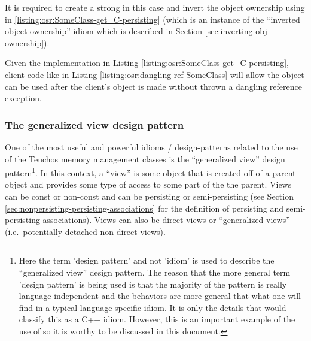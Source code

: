 \documentclass[pdf,ps2pdf,11pt]{SANDreport}
\begin{document}
It is required to create a strong {} in this case and
invert the object ownership using in
{}\ref{listing:osr:SomeClass-get_C-persisting} (which is an instance
of the ``inverted object ownership'' idiom which is described in
Section {}\ref{sec:inverting-obj-ownership}).

Given the implementation in Listing
{}\ref{listing:osr:SomeClass-get_C-persisting}, client code like in
Listing {}\ref{listing:osr:dangling-ref-SomeClass} will allow the
{} object can be used after the client's
{} object is made {} without
thrown a dangling reference exception.


%
{}\subsubsection{The generalized view design pattern}
\label{sec:generalized-view-design-pattern}
%

One of the most useful and powerful idioms / design-patterns related
to the use of the Teuchos memory management classes is the
``generalized view'' design pattern\footnote{Here the term 'design
pattern' and not 'idiom' is used to describe the ``generalized view''
design pattern.  The reason that the more general term 'design
pattern' is being used is that the majority of the pattern is really
language independent and the behaviors are more general that what one
will find in a typical language-specific idiom.  It is only the
{} details that would classify this as a C++ idiom.  However,
this is an important example of the use of {} so it is worthy
to be discussed in this document.}.  In this context, a ``view'' is
some object that is created off of a parent object and provides some
type of access to some part of the the parent.  Views can be const or
non-const and can be persisting or semi-persisting (see Section
{}\ref{sec:nonpersisting-persisting-associations} for the definition
of persisting and semi-persisting associations).  Views can also be
direct views or ``generalized views'' (i.e.\ potentially detached
non-direct views).
\end{document}
